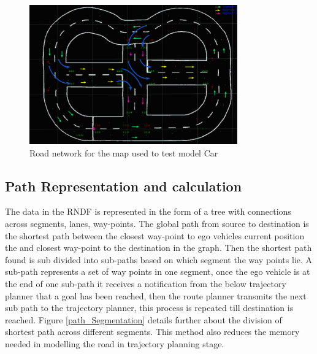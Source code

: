 \begin{figure}
    \centering
    \includegraphics[width=0.8\textwidth]{Images/map_rndf.png}
    \caption{Road network for the map used to test model Car}
    \label{map_rndf}
\end{figure}



\subsection{Path Representation and calculation}

The data in the RNDF is represented in the form of a tree with connections across segments, lanes, way-points. The global path from source to destination is the shortest path between the closest way-point to ego vehicles current position the and closest way-point to the destination in the graph. Then the shortest path found is sub divided into sub-paths based on which segment the way points lie. A sub-path represents a set of way points in one segment, once the ego vehicle is at the end of one sub-path it receives a notification from the below trajectory planner that a goal has been reached, then the route planner transmits the next sub path to the trajectory planner, this process is repeated till destination is reached. Figure \ref{path_Segmentation} details further about the division of shortest path across different segments. This method also reduces the memory needed in modelling the road in trajectory planning stage.

